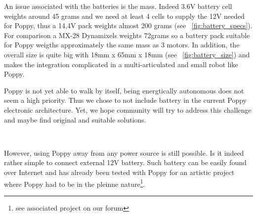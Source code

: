 An issue associated with the batteries is the mass. Indeed 3.6V battery cell weights around 45 grams and we need at least 4 cells to supply the 12V needed for Poppy, thus a 14,4V pack weights almost 200 grams (see \figurename~\ref{fig:battery_specs}). For comparison a MX-28 Dynamixels weights 72grams so a battery pack suitable for Poppy weigths approximately the same mass as 3 motors.
In addition, the overall size is quite big with 18mm x 65mm x 18mm (see \figurename~\ref{fig:battery_size}) and makes the integration complicated in a multi-articulated and small robot like Poppy.

Poppy is not yet able to walk by itself, being energtically autonomous does not seem a high priority. Thus we chose to not include battery in the current Poppy electronic architecture. Yet, we hope community will try to address this challenge and maybe find original and suitable solutions.

\begin{figure}[tb]
\centering
    \hfil
    \\
    \caption{}
    \label{fig:tyva_batteries}
\end{figure}

However, using Poppy away from any power source is still possible. Is it indeed rather simple to connect external 12V battery. Such battery can be easily found over Internet and has already been tested with Poppy for an artistic project where Poppy had to be in the pleinne nature\footnote{see associated project on our forum}.





